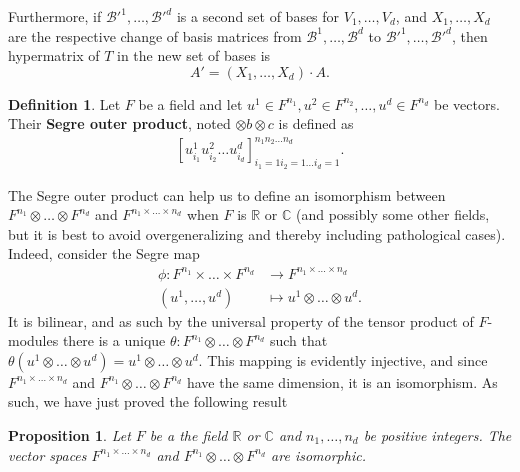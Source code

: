 \documentclass{report}
\newtheorem{prop}{Proposition}
\theoremstyle{definition}
\newtheorem{defin}{Definition}
\theoremstyle{remark}
\begin{document}
Furthermore, if $\mathcal{B}'^1, \dots, \mathcal{B}'^d$ is a second set of bases for $V_1, \dots, V_d$, and $X_1, \dots, X_d$ are the respective change of basis matrices from $\mathcal{B}^1, \dots , \mathcal{B}^d$ to $\mathcal{B}'^1 , \dots, \mathcal{B}'^d$, then hypermatrix of $T$ in the new set of bases is 
\begin{equation*}
    A' = (X_1, \dots, X_d) \cdot A.
\end{equation*}

\begin{defin}
        Let $F$ be a field and let  $u^1 \in F^{n_1}, u^2 \in F^{n_2}, \dots, u^d \in F^{n_d} $ be vectors.
        Their \textbf{Segre outer product}, noted $ \otimes b \otimes c$ is defined as
        \begin{equation*}
                \begin{split}
                        [u^1_{i_1} u^2_{i_2} \dots u^d_{i_d}]_{i_1 = 1 i_2 = 1 \dots i_d =1}^{n_1 n_2 \dots n_d}
        .        \end{split}
        \end{equation*}
\end{defin}

The Segre outer product can help us to define an isomorphism between $F^{n_1} \otimes \dots \otimes F^{n_d}$ and $F^{n_1 \times \dots \times n_d}$ when $F$ is $\mathbb{R}$ or $\mathbb{C}$ (and possibly some other fields, but it is best to avoid overgeneralizing and thereby including pathological cases). Indeed, consider the Segre map
\begin{equation*}
    \begin{split}
    \phi : F^{n_1} \times \dots \times F^{n_d} & \to F^{n_1 \times \dots \times n_d} \\
    (u^1, \dots, u^d) & \mapsto u^1 \otimes \dots \otimes u^d.
    \end{split}
\end{equation*}
 It is bilinear, and as such by the universal property of the tensor product of $F$-modules there is a unique $\theta : F^{n_1} \otimes \dots \otimes F^{n_d}$ such that $\theta (u^1 \otimes \dots \otimes u^d ) = u^1 \otimes \dots \otimes u^d$. This mapping is evidently injective, and since $F^{n_1 \times \dots \times n_d}$ and $F^{n_1}\otimes \dots \otimes F^{n_d}$ have the same dimension, it is an isomorphism. 
As such, we have just proved the following result
\begin{prop}
    Let $F$ be a the field $\mathbb{R}$ or $\mathbb{C}$ and $n_1, \dots, n_d$ be positive integers. The vector spaces $F^{n_1 \times \dots \times n_d}$ and $F^{n_1} \otimes \dots \otimes F^{n_d}$ are isomorphic. 
\end{prop}
\end{document}
